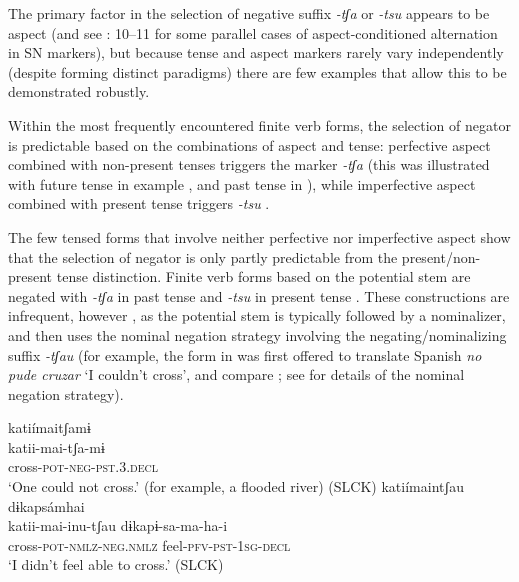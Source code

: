 \documentclass[output=paper,colorlinks,citecolor=brown,draft]{langscibook}
\begin{document}
The primary factor in the selection of negative suffix \textit{{}-tʃa}  or \textit{\nobreakdash-tsu} appears to be aspect (and see \citealt{Croft1991}: 10–11 for some parallel cases of aspect-conditioned alternation in SN markers), but because tense and aspect markers rarely vary independently (despite forming distinct paradigms) there are few examples that allow this to be demonstrated robustly.

Within the most frequently encountered finite verb forms, the selection of negator is predictable based on the combinations of aspect and tense: perfective aspect combined with non-present tenses triggers the marker \textit{{}-tʃa} (this was illustrated with future tense in example , and past tense in ), while imperfective aspect combined with present tense triggers \textit{\nobreakdash-tsu} .

The few tensed forms that involve neither perfective nor imperfective aspect show that the selection of negator is only partly predictable from the present/non-present tense distinction. Finite verb forms based on the potential stem are negated with \textit{\nobreakdash-tʃa} in past tense  and \textit{\nobreakdash-tsu} in present tense . These constructions are infrequent, however \citep[336]{Overall2017a}, as the potential stem is typically followed by a nominalizer, and then uses the nominal negation strategy involving the negating/nominalizing suffix \textit{\nobreakdash-tʃau} (for example, the form in  was first offered to translate Spanish \textit{no pude cruzar} ‘I couldn’t cross’, and compare ; see  for details of the nominal negation strategy).

\ea\label{ex:agu:4}
    \ea\label{ex:agu:4a}
        \glll katiímaitʃamɨ \\ 
              katii-mai-tʃa-mɨ \\
              cross-\textsc{pot-neg-pst.3.decl} \\
        \glt ‘One could not cross.’ (for example, a flooded river) (SLCK)
    \ex\label{ex:agu:4b}
        \glll katiímaintʃau dɨkapsámhai \\
              katii-mai-inu-tʃau  dɨkapɨ-sa-ma-ha-i \\
              cross-\textsc{pot-nmlz-neg.nmlz}  feel-\textsc{pfv-pst-1sg-decl} \\
        \glt \textsc{‘}I didn’t feel able to cross.’ (SLCK)
    \z
\z 
\end{document}
